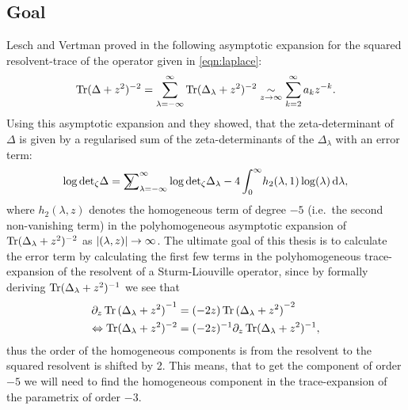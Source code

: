 
\subsection{Goal}
Lesch and Vertman proved in \cite{LV13} the following asymptotic expansion for
the squared resolvent-trace of the operator given in \eqref{eqn:laplace}:
\begin{align}
  \operatorname{Tr}(\Delta + z^2)^{-2} = \sum_{\lambda=-\infty}^\infty \operatorname{Tr}(\Delta_\lambda +
  z^2)^{-2} \mathrel{\underset{z\to\infty}{\sim}} \sum_{k=2}^{\infty} a_kz^{-k}.
\end{align}
Using this asymptotic expansion and  they showed, that the
zeta-determinant of $\Delta$ is given by a regularised sum of the
zeta-determinants of the $\Delta_\lambda$ with an error term:
\begin{align}
  \label{eqn:central-thm}
  \log\zdet\Delta = \Regsum_{\lambda=-\infty}^\infty
  \log\zdet\Delta_\lambda -
  4\Integ[\infty]{0}{\lambda}{h_2(\lambda, 1)\log(\lambda)},
\end{align}
where $h_2(\lambda, z)$ denotes the homogeneous term of degree $-5$ (i.e.\ the
second non-vanishing term) in the polyhomogeneous asymptotic expansion of
$\operatorname{Tr}(\Delta_\lambda + z^2)^{-2}$ as $\left|(\lambda, z)\right|\to\infty$. The ultimate
goal of this thesis is to calculate the error term by calculating the first few
terms in the polyhomogeneous trace-expansion of the resolvent of a
Sturm-Liouville operator, since by formally deriving $\operatorname{Tr}(\Delta_\lambda +
z^2)^{-1}$ we see that
\begin{align}
  \label{frm:shift}
  \partial_z \Tr{(\Delta_\lambda + z^2)}^{-1} &=
        (-2z) \Tr{(\Delta_\lambda + z^2)}^{-2} \\
        \Leftrightarrow \Tr(\Delta_\lambda + z^2)^{-2} &=
        (-2z)^{-1}\partial_z\Tr(\Delta_\lambda + z^2)^{-1},
\end{align}
thus the order of the homogeneous components is from the resolvent to the
squared resolvent is shifted by 2. This means, that to get the component of
order $-5$ we will need to find the homogeneous component in the trace-expansion
of the parametrix of order $-3$.
